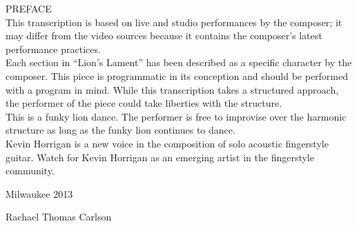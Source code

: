 \begin{titlepage}
    \vspace*{1.73cm}
    {\Large PREFACE}\\[.5cm]
    This transcription is based on live and studio performances by the
    composer; it may differ from the video sources because it contains the
    composer's latest performance practices.\\
    \indent Each section in ``Lion's Lament'' has been described as a specific
    character by the composer.  This piece is programmatic in its conception
    and should be performed with a program in mind.  While this transcription takes a
    structured approach, the performer of the piece could take liberties with
    the structure.\\  
    \indent This is a funky lion dance.  The performer is free to improvise over the
    harmonic structure as long as the funky lion continues to dance.\\  
    \indent Kevin Horrigan is a new voice in the composition of solo acoustic
    fingerstyle guitar.  Watch for Kevin Horrigan as an emerging artist in the fingerstyle community.\\

    \date{}
    \begin{center}
    \begin{minipage}{0.4\textwidth}
        \begin{flushleft} 
            Milwaukee 2013\\
        \end{flushleft}
    \end{minipage}
    \begin{minipage}{0.4\textwidth}
        \begin{flushright} 
            Rachael Thomas Carlson
        \end{flushright}
    \end{minipage}
    \end{center}
    \vfill
\end{titlepage}
